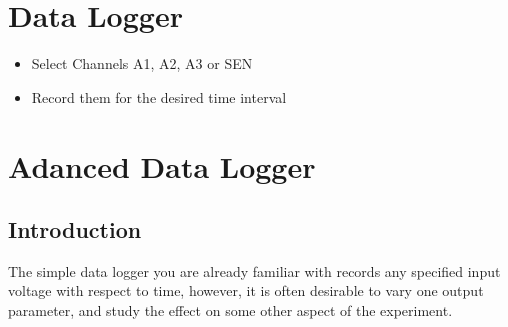 \documentclass[a4paper,12pt,english]{sphinxmanual}
\begin{document}
\section{Data Logger}
\label{\detokenize{6.6:data-logger}}\label{\detokenize{6.6::doc}}\begin{itemize}
\item {} 
Select Channels A1, A2, A3 or SEN

\item {} 
Record them for the desired time interval

\end{itemize}


\section{Adanced Data Logger}
\label{\detokenize{6.7:adanced-data-logger}}\label{\detokenize{6.7::doc}}

\subsection{Introduction}
\label{\detokenize{6.7:introduction}}
The simple data logger you are already familiar with records any
specified input voltage with respect to time, however, it is often
desirable to vary one output parameter, and study the effect on some
other aspect of the experiment.
\end{document}
